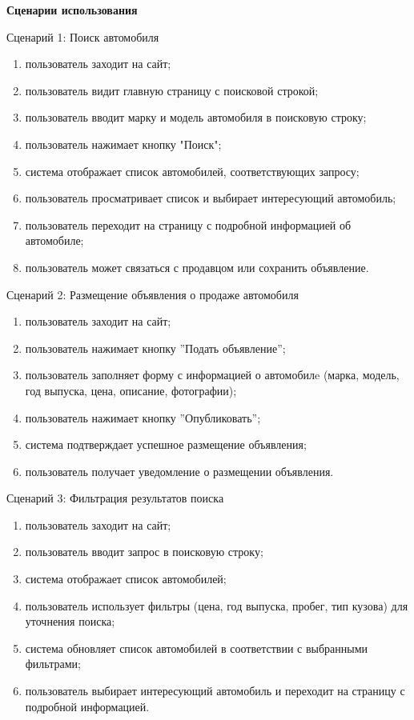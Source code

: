 \textbf{Сценарии использования}

Сценарий 1: Поиск автомобиля

\begin{enumerate}
    \item пользователь заходит на сайт;
    \item пользователь видит главную страницу с поисковой строкой;
    \item пользователь вводит марку и модель автомобиля в поисковую строку;
    \item пользователь нажимает кнопку "Поиск";
    \item система отображает список автомобилей, соответствующих запросу;
    \item пользователь просматривает список и выбирает интересующий автомобиль;
    \item пользователь переходит на страницу с подробной информацией об автомобиле;
    \item пользователь может связаться с продавцом или сохранить объявление.
\end{enumerate}
\bigskip

Сценарий 2: Размещение объявления о продаже автомобиля

\begin{enumerate}
    \item пользователь заходит на сайт;
    \item пользователь нажимает кнопку ”Подать объявление”;
    \item пользователь заполняет форму с информацией о автомобилe (марка, модель, год выпуска, цена, описание, фотографии);
    \item пользователь нажимает кнопку ”Опубликовать”;
    \item система подтверждает успешное размещение объявления;
    \item пользователь получает уведомление о размещении объявления.
\end{enumerate}
\bigskip

Сценарий 3: Фильтрация результатов поиска

\begin{enumerate}
    \item пользователь заходит на сайт;
    \item пользователь вводит запрос в поисковую строку;
    \item система отображает список автомобилей;
    \item пользователь использует фильтры (цена, год выпуска, пробег, тип кузова) для уточнения поиска;
    \item система обновляет список автомобилей в соответствии с выбранными фильтрами;
    \item пользователь выбирает интересующий автомобиль и переходит на страницу с подробной информацией.
\end{enumerate}
\bigskip

